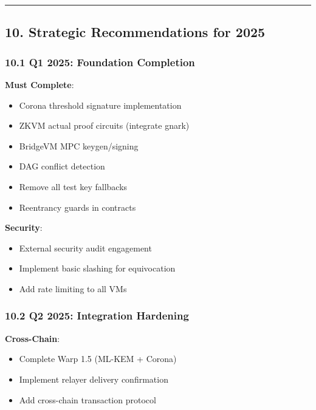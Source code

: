 \documentclass[
]{article}
\providecommand{\tightlist}{%
  \setlength{\itemsep}{0pt}\setlength{\parskip}{0pt}}
\begin{document}
\begin{center}\rule{0.5\linewidth}{0.5pt}\end{center}

\subsection{10. Strategic Recommendations for
2025}\label{10-strategic-recommendations-for-2025}

\subsubsection{10.1 Q1 2025: Foundation
Completion}\label{101-q1-2025-foundation-completion}

\textbf{Must Complete}:

\begin{itemize}
\tightlist
\item[$\square$]
  Corona threshold signature implementation
\item[$\square$]
  ZKVM actual proof circuits (integrate gnark)
\item[$\square$]
  BridgeVM MPC keygen/signing
\item[$\square$]
  DAG conflict detection
\item[$\square$]
  Remove all test key fallbacks
\item[$\square$]
  Reentrancy guards in contracts
\end{itemize}

\textbf{Security}:

\begin{itemize}
\tightlist
\item[$\square$]
  External security audit engagement
\item[$\square$]
  Implement basic slashing for equivocation
\item[$\square$]
  Add rate limiting to all VMs
\end{itemize}

\subsubsection{10.2 Q2 2025: Integration
Hardening}\label{102-q2-2025-integration-hardening}

\textbf{Cross-Chain}:

\begin{itemize}
\tightlist
\item[$\square$]
  Complete Warp 1.5 (ML-KEM + Corona)
\item[$\square$]
  Implement relayer delivery confirmation
\item[$\square$]
  Add cross-chain transaction protocol
\end{itemize}
\end{document}
